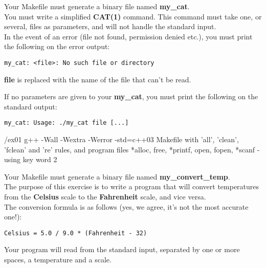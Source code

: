 Your Makefile must generate a binary file named \textbf{my\_cat}.\\

You must write a simplified \textbf{CAT(1)} command. This command must take one, or several, files as parameters, and will not handle the standard input.\\

In the event of an error (file not found, permission denied etc.), you must print the following on the error output:

\begin{lstlisting}
my_cat: <file>: No such file or directory
\end{lstlisting}

\hint
{
  \textbf{file} is replaced with the name of the file that can't be read.
}

If no parameters are given to your \textbf{my\_cat}, you must print the following on the standard output:

\begin{lstlisting}
my_cat: Usage: ./my_cat file [...]
\end{lstlisting}

\newpage

\printCPPExerciseFormalities
{/ex01}
{g++ -Wall -Wextra -Werror -std=c++03}
{Makefile with 'all', 'clean', 'fclean' and 're' rules, and program files}
{*alloc, free, *printf, open, fopen, *scanf - using key word}
{2}


Your Makefile must generate a binary file named \textbf{my\_convert\_temp}.\\
The purpose of this exercise is to write a program that will convert temperatures from the \textbf{Celsius} scale to the \textbf{Fahrenheit} scale, and vice versa.\\
The conversion formula is as follows (yes, we agree, it's not the most accurate one!):

\begin{lstlisting}
Celsius = 5.0 / 9.0 * (Fahrenheit - 32)
\end{lstlisting}

Your program will read from the standard input, separated by one or more spaces, a temperature and a scale.\\

